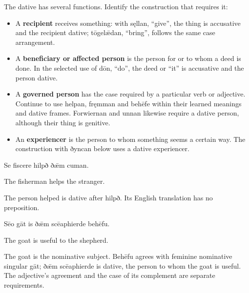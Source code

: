 The dative has several functions. Identify the construction that requires it:

\begin{itemize}
\item A \textbf{recipient} receives something: with sęllan, “give”, the thing is accusative and the recipient dative; tōgelǣdan, “bring”, follows the same case arrangement.
\item A \textbf{beneficiary or affected person} is the person for or to whom a deed is done. In the selected use of dōn, “do”, the deed or “it” is accusative and the person dative.
\item A \textbf{governed person} has the case required by a particular verb or adjective. Continue to use helpan, fręmman and behēfe within their learned meanings and dative frames. Forwiernan and unnan likewise require a dative person, although their thing is genitive.
\item An \textbf{experiencer} is the person to whom something seems a certain way. The construction with ðyncan below uses a dative experiencer.
\end{itemize}

Se fiscere hilpð ðǣm cuman.

The fisherman helps the stranger.

The person helped is dative after hilpð. Its English translation has no preposition.

Sēo gāt is ðǣm scēaphierde behēfu.

The goat is useful to the shepherd.

The goat is the nominative subject. Behēfu agrees with feminine nominative singular gāt; ðǣm scēaphierde is dative, the person to whom the goat is useful. The adjective's agreement and the case of its complement are separate requirements.

